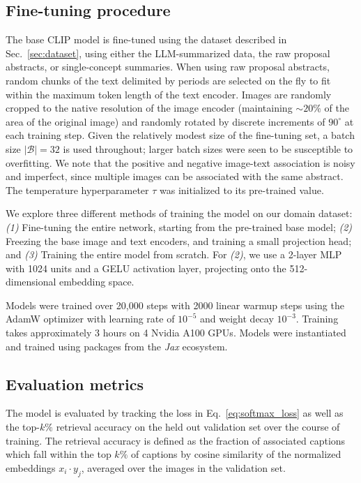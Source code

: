 \documentclass[10pt]{article} %
\newcommand{\package}[1]{\textsl{#1}\xspace}
\begin{document}
\subsection{Fine-tuning procedure}

The base CLIP model is fine-tuned using the dataset described in Sec.~\ref{sec:dataset}, using either the LLM-summarized data, the raw proposal abstracts, or single-concept summaries.
%
When using raw proposal abstracts, random chunks of the text delimited by periods are selected on the fly to fit within the maximum token length of the text encoder.
%
Images are randomly cropped to the native resolution of the image encoder (maintaining $\sim 20\%$ of the area of the original image) and randomly rotated by discrete increments of $90^\circ$ at each training step.
%
Given the relatively modest size of the fine-tuning set, a batch size $|\mathcal B| = 32$ is used throughout; larger batch sizes were seen to be susceptible to overfitting.
%
We note that the positive and negative image-text association is noisy and imperfect, since multiple images can be associated with the same abstract. The temperature hyperparameter $\tau$ was initialized to its pre-trained value.

We explore three different methods of training the model on our domain dataset: \emph{(1)} Fine-tuning the entire network, starting from the pre-trained base model; \emph{(2)} Freezing the base image and text encoders, and training a small projection head; and \emph{(3)} Training the entire model from scratch.
%
For \emph{(2)}, we use a 2-layer MLP with 1024 units and a GELU activation layer, projecting onto the 512-dimensional embedding space.

Models were trained over 20,000 steps with 2000 linear warmup steps 
using the AdamW optimizer \citep{DBLP:conf/iclr/LoshchilovH19,DBLP:journals/corr/KingmaB14} with  %
learning rate of $10^{-5}$ and weight decay $10^{-3}$.
%
Training takes approximately 3 hours on 4 Nvidia A100 GPUs.
Models were instantiated and trained using packages from the \package{Jax} \citep{jax2018github} ecosystem.
%


\subsection{Evaluation metrics}

The model is evaluated by tracking the loss in Eq.~\ref{eq:softmax_loss} as well as the top-$k\%$ retrieval accuracy on the held out validation set over the course of training.
%
The retrieval accuracy is defined as the fraction of associated captions which fall within the top $k\%$ of captions by cosine similarity of the normalized embeddings $x_i \cdot y_j$, averaged over the images in the validation set.
\end{document}
